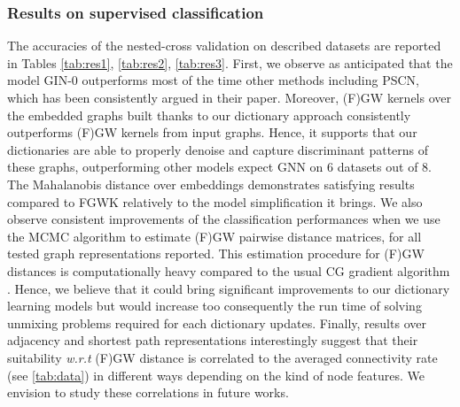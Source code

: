 \documentclass{article}
\begin{document}
	\subsubsection{Results on supervised classification} The accuracies of the nested-cross validation on described datasets are reported in Tables \ref{tab:res1}, \ref{tab:res2}, \ref{tab:res3}. First, we observe as anticipated that the model GIN-0 \citep{xu2018powerful} outperforms most of the time other methods including PSCN, which has been consistently argued in their paper. Moreover, (F)GW kernels over the embedded graphs built thanks to our dictionary approach consistently outperforms (F)GW kernels from input graphs. Hence, it supports that our dictionaries are able to properly denoise and capture discriminant patterns of these graphs, outperforming other models expect GNN on 6 datasets out of 8. The Mahalanobis distance over embeddings  demonstrates satisfying results compared to FGWK relatively to the model simplification it brings. We also observe consistent improvements of the classification performances when we use the MCMC algorithm \citep{chowdhury-generalized-2020} to estimate (F)GW pairwise distance matrices, for all tested graph representations reported. This estimation procedure for (F)GW distances is computationally heavy compared to the usual CG gradient algorithm \citep{vayer-fused-2018}. Hence, we believe that it could bring significant improvements to our dictionary learning models but would increase too consequently the run time of solving unmixing problems required for each dictionary updates. Finally, results over adjacency and shortest path representations interestingly suggest that their suitability \emph{w.r.t} (F)GW distance is correlated to the averaged connectivity rate (see \ref{tab:data}) in different ways depending on the kind of node features. We envision to study these correlations in future works.
	\vspace{-4mm}
\end{document}
